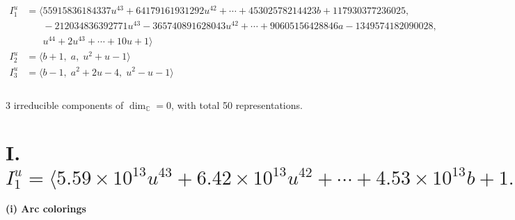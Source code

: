 \documentclass[1p]{elsarticle_modified}
\theoremstyle{definition}
\begin{document}
\begin{align*}
I^u_{1}&=\langle 
55915836184337 u^{43}+64179161931292 u^{42}+\cdots+45302578214423 b+117930377236025,\\
\phantom{I^u_{1}}&\phantom{= \langle  }-212034836392771 u^{43}-365740891628043 u^{42}+\cdots+90605156428846 a-1349574182090028,\\
\phantom{I^u_{1}}&\phantom{= \langle  }u^{44}+2 u^{43}+\cdots+10 u+1\rangle \\
I^u_{2}&=\langle 
b+1,\;a,\;u^2+u-1\rangle \\
I^u_{3}&=\langle 
b-1,\;a^2+2 u-4,\;u^2- u-1\rangle \\
\\
\end{align*}
\raggedright * 3 irreducible components of $\dim_{\mathbb{C}}=0$, with total 50 representations.\\
\newpage
\renewcommand{\arraystretch}{1}
\centering \section*{I. $I^u_{1}= \langle 5.59\times10^{13} u^{43}+6.42\times10^{13} u^{42}+\cdots+4.53\times10^{13} b+1.18\times10^{14},\;-2.12\times10^{14} u^{43}-3.66\times10^{14} u^{42}+\cdots+9.06\times10^{13} a-1.35\times10^{15},\;u^{44}+2 u^{43}+\cdots+10 u+1 \rangle$}
\flushleft \textbf{(i) Arc colorings}\\
\end{document}
